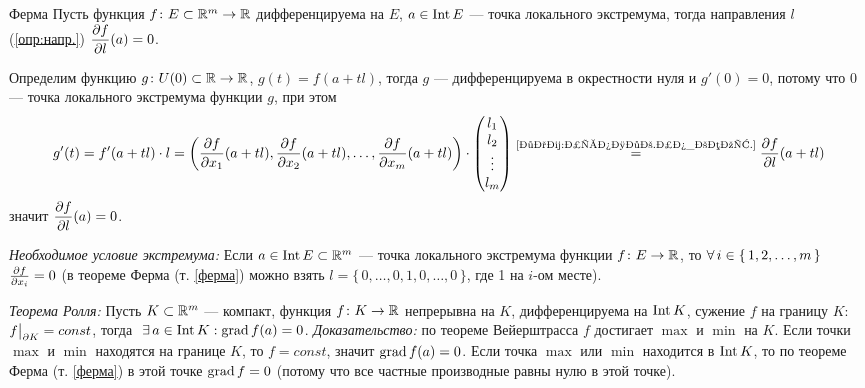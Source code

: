 \begin{teor}[https://www.youtube.com/live/oGN0SkfpZME?si=IUuLLNxy2ax4nH0N&t=1300]{Ферма}\label{ферма}
	Пусть функция $f \colon E \subset \mathbb R^m \to \mathbb R$ дифференцируема \smallskip на $E$, $a \in \mathrm{Int}\, E$ --- точка локального экстремума, тогда \A направления $l$ (\ref{опр:напр.}) \small$\displaystyle\frac{\partial f}{\partial l}(a) = 0$. 
\end{teor}

\begin{prf}
	Определим функцию $g\colon U(0) \subset \mathbb R \to \mathbb R$, $g(t) = f(a + tl)$, тогда $g$ --- дифференцируема в окрестности нуля и $g'(0) = 0$, потому что $0$ --- точка локального экстремума функции $g$, при этом 
	\[g'(t) = f'(a + tl) \cdot l = \left(\frac{\partial f}{\partial x_1}(a + tl), \frac{\partial f}{\partial x_2}(a + tl), \ldots, \frac{\partial f}{\partial x_m}(a + tl)\right) \cdot
	\begin{pmatrix} l_1 \\ l_2 \\ \vdots \\ l_m \end{pmatrix} \stackrel{\text{\ref{зам:произв.по_вект.}}}{=} \frac{\partial f}{\partial l}(a + tl)\]
	значит $\displaystyle\frac{\partial f}{\partial l}(a) = 0$.
\end{prf}

\begin{slv}[https://www.youtube.com/live/oGN0SkfpZME?si=B74TnyBQXKKDpNlM&t=1691]
	\textit{Необходимое условие экстремума:} Если $a \in \mathrm{Int}\, E \subset \mathbb R^m$ --- точка локального экстремума функции $f\colon E \to \mathbb R$, то $\forall \, i \in \{\, 1, 2, \ldots, m \,\}$ $\frac{\partial f}{\partial x_i} = 0$ (в теореме Ферма (т. \ref{ферма}) можно взять $l = \{\,0, \ldots, 0, 1, 0, \ldots, 0\,\}$, где 1 на $i$-ом месте).
\end{slv}

\begin{slv}[https://www.youtube.com/live/oGN0SkfpZME?si=icr0a6IMCeINfjyk&t=1790]
	\textit{Теорема Ролля:} Пусть $K \subset \mathbb R^m$ --- компакт, функция $f \colon K \to \mathbb R$ непрерывна на $K$, дифференцируема на $\mathrm{Int}\, K$, сужение $f$ на границу $K$: $f\big|_{\partial K}^{} = const$, \smallskip тогда$\E a \in \Int K : \grad f(a) = 0$.\linebreak
	\textit{Доказательство:} по теореме Вейерштрасса $f$ достигает $\max$ и $\min$ на $K$. Если точки $\max$ и $\min$ находятся на границе $K$, то $f = const$, значит $\mathrm{grad\,} f(a) = 0$. Если точка $\max$ или $\min$ находится в $\mathrm{Int}\, K$, то по теореме Ферма (т. \ref{ферма}) в этой точке $\mathrm{grad\,} f = 0$ (потому что все частные производные равны нулю в этой точке). 
\end{slv}

